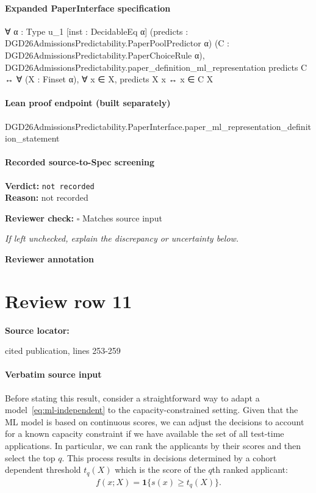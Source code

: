 \documentclass[10pt]{article}
\newcommand{\reviewerbox}{%
  \par\noindent\fbox{\parbox{0.96\linewidth}{\rule{0pt}{0.38in}}}\par
}
\newcommand{\reviewmatch}[1]{%
  \par\noindent\textbf{Reviewer check:} $\square$\; #1\par
  \noindent\emph{If left unchecked, explain the discrepancy or uncertainty below.}\par
}
\begin{document}
\paragraph{Expanded PaperInterface specification}
\begin{ReviewVerbatim}
∀ {α : Type u_1} [inst : DecidableEq α] (predicts : DGD26AdmissionsPredictability.PaperPoolPredictor α)
  (C : DGD26AdmissionsPredictability.PaperChoiceRule α),
  DGD26AdmissionsPredictability.paper_definition_ml_representation predicts C ↔
    ∀ (X : Finset α), ∀ x ∈ X, predicts X x ↔ x ∈ C X
\end{ReviewVerbatim}

\paragraph{Lean proof endpoint (built separately)}\begin{ReviewVerbatim}
DGD26AdmissionsPredictability.PaperInterface.paper_ml_representation_definition_statement
\end{ReviewVerbatim}

\paragraph{Recorded source-to-Spec screening}
\textbf{Verdict:} \texttt{not recorded}
\\
\textbf{Reason:} not recorded
\reviewmatch{Matches source input}
\noindent\textbf{Reviewer annotation}\par
\reviewerbox
\clearpage
\hypertarget{source-claim-1e70e813c2db1d8e}{}
\section*{Review row 11}
\textbf{Source locator:} {\footnotesize\raggedright cited publication, lines 253-\allowbreak{}259\par}
\paragraph{Verbatim source input}
\begin{ReviewVerbatim}
Before stating this result, consider a straightforward way to adapt a model~\eqref{eq:ml-independent} to the capacity-constrained setting.
Given that the ML model is based on continuous scores, we can adjust the decisions to account for a known capacity constraint if we have available the set of all test-time applications.
In particular, we can rank the applicants by their scores and then select the top $q$.
This process results in decisions determined by a cohort dependent threshold $t_q(X)$ which is the score of the $q$th ranked applicant:
\begin{align}\label{eq:ml-rank}
    f(x; X) = \mathbf 1\{s(x) \geq t_q(X)\}.
\end{align}
\end{ReviewVerbatim}
\end{document}
